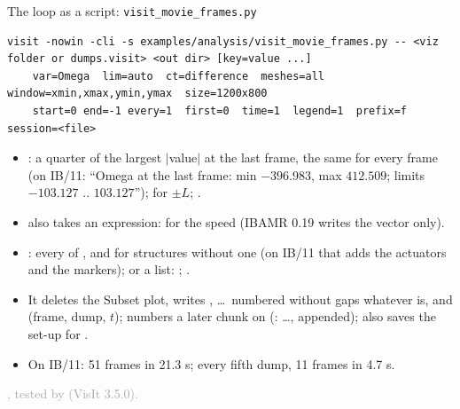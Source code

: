 \documentclass[aspectratio=169,11pt]{beamer}
\newcommand{\sourcecredit}[1]{\vfill\begin{flushright}\tiny\textcolor{DarkGray}{#1}\end{flushright}}
\begin{document}
\begin{frame}[fragile]{The loop as a script: \texttt{visit\_movie\_frames.py}}
\label{fr:framescript}
\begin{lstlisting}[style=pytiny]
visit -nowin -cli -s examples/analysis/visit_movie_frames.py -- <viz folder or dumps.visit> <out dir> [key=value ...]
    var=Omega  lim=auto  ct=difference  meshes=all  window=xmin,xmax,ymin,ymax  size=1200x800
    start=0 end=-1 every=1  first=0  time=1  legend=1  prefix=f  session=<file>
\end{lstlisting}
\scriptsize
\begin{itemize}\setlength{\itemsep}{1pt}
  \item {}: a quarter of the largest $|$value$|$ at the last frame, the same for every frame (on IB/11: ``Omega at the last frame: min $-396.983$, max $412.509$; limits $-103.127$ .. $103.127$'');  for $\pm L$; .
  \item {} also takes an expression:  for the speed (IBAMR 0.19 writes the vector  only).
  \item {}: every  of , and  for structures without one (on IB/11 that adds the actuators and the markers); or a list: ; .
  \item It deletes the Subset plot, writes , \dots\ numbered without gaps whatever  is, and  (frame, dump, $t$);  numbers a later chunk on (:  \dots,  appended);  also saves the set-up for .
  \item On IB/11: 51 frames in 21.3 s; every fifth dump, 11 frames in 4.7 s.
\end{itemize}
\sourcecredit{, tested by \code{wsl/final/ch30\_examples.sh} (VisIt 3.5.0).}
\end{frame}
\end{document}

